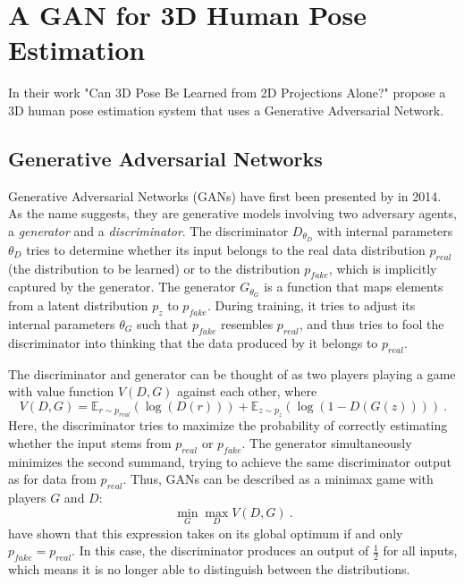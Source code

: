 \section{A GAN for 3D Human Pose Estimation}
\label{sec:network}
In their work "Can 3D Pose Be Learned from 2D Projections Alone?" \citet{drover18} propose a 3D human pose estimation system that uses a Generative Adversarial Network.

\subsection{Generative Adversarial Networks}
Generative Adversarial Networks (GANs) have first been presented by \citet{goodfellow14} in 2014.
As the name suggests, they are generative models involving two adversary agents, a \emph{generator} and a \emph{discriminator}.
The discriminator $D_{\theta_D}$ with internal parameters $\theta_D$ tries to determine whether its input belongs to the real data distribution $p_{real}$ (the distribution to be learned) or to the distribution $p_{fake}$, which is implicitly captured by the generator.
The generator $G_{\theta_G}$ is a function that maps elements from a latent distribution $p_z$ to $p_{fake}$.
During training, it tries to adjust its internal parameters $\theta_G$ such that $p_{fake}$ resembles $p_{real}$, and thus tries to fool the discriminator into thinking that the data produced by it belongs to $p_{real}$.

The discriminator and generator can be thought of as two players playing a game with value function $V(D, G)$ against each other, where
\begin{equation}
	V(D, G) = \mathbb{E}_{r\sim p_{real}}(\log(D(r))) + \mathbb{E}_{z\sim p_{z}}(\log(1 - D(G(z)))) \ .
\end{equation}
Here, the discriminator tries to maximize the probability of correctly estimating whether the input stems from $p_{real}$ or $p_{fake}$.
The generator simultaneously minimizes the second summand, trying to achieve the same discriminator output as for data from $p_{real}$.
Thus, GANs can be described as a minimax game with players $G$ and $D$:
\begin{equation}
\min_G \max_D V(D, G) \ .
\end{equation}
\citet{goodfellow14} have shown that this expression takes on its global optimum if and only $p_{fake} = p_{real}$.
In this case, the discriminator produces an output of $\frac{1}{2}$ for all inputs, which means it is no longer able to distinguish between the distributions.

